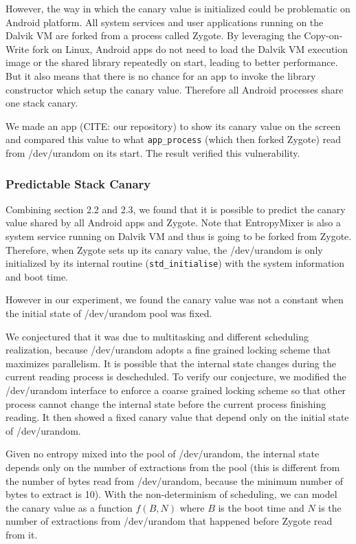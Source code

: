 However, the way in which the canary value is initialized could be problematic on Android platform. All system services and user applications running on the Dalvik VM are forked from a process called Zygote. By leveraging the Copy-on-Write fork on Linux, Android apps do not need to load the Dalvik VM execution image or the shared library repeatedly on start, leading to better performance. But it also means that there is no chance for an app to invoke the library constructor which setup the canary value. Therefore all Android processes share one stack canary.

We made an app (CITE: our repository) to show its canary value on the screen and compared this value to what \verb|app_process| (which then forked Zygote) read from /dev/urandom on its start. The result verified this vulnerability. 

\subsubsection{Predictable Stack Canary}

Combining section 2.2 and 2.3, we found that it is possible to predict the canary value shared by all Android apps and Zygote. Note that EntropyMixer is also a system service running on Dalvik VM and thus is going to be forked from Zygote. Therefore, when Zygote sets up its canary value, the /dev/urandom is only initialized by its internal routine (\verb|std_initialise|)  with the system information and boot time.

However in our experiment, we found the canary value was not a constant when the initial state of /dev/urandom pool was fixed. 

We conjectured that it was due to multitasking and different scheduling realization, because /dev/urandom adopts a fine grained locking scheme that maximizes parallelism. It is possible that the internal state changes during the current reading process is descheduled. To verify our conjecture, we modified the /dev/urandom interface to enforce a coarse grained locking scheme so that other process cannot change the internal state before the current process finishing reading. It then showed a fixed canary value that depend only on the initial state of /dev/urandom.

Given no entropy mixed into the pool of /dev/urandom, the internal state depends only on the number of extractions from the pool (this is different from the number of bytes read from /dev/urandom, because the minimum number of bytes to extract is 10). With the non-determinism of scheduling, we can model the canary value as a function $f(B,N)$ where $B$ is the boot time and $N$ is the number of extractions from /dev/urandom that happened before Zygote read from it.


